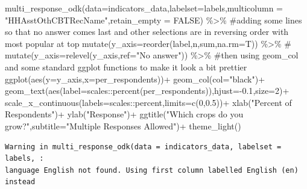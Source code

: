 \documentclass[
  letterpaper,
  DIV=11,
  numbers=noendperiod]{scrreprt}
\newenvironment{Shaded}{\begin{snugshade}}{\end{snugshade}}
\newcommand{\AttributeTok}[1]{\textcolor[rgb]{0.40,0.45,0.13}{#1}}
\newcommand{\CommentTok}[1]{\textcolor[rgb]{0.37,0.37,0.37}{#1}}
\newcommand{\ConstantTok}[1]{\textcolor[rgb]{0.56,0.35,0.01}{#1}}
\newcommand{\DecValTok}[1]{\textcolor[rgb]{0.68,0.00,0.00}{#1}}
\newcommand{\FloatTok}[1]{\textcolor[rgb]{0.68,0.00,0.00}{#1}}
\newcommand{\FunctionTok}[1]{\textcolor[rgb]{0.28,0.35,0.67}{#1}}
\newcommand{\NormalTok}[1]{\textcolor[rgb]{0.00,0.23,0.31}{#1}}
\newcommand{\SpecialCharTok}[1]{\textcolor[rgb]{0.37,0.37,0.37}{#1}}
\newcommand{\StringTok}[1]{\textcolor[rgb]{0.13,0.47,0.30}{#1}}
\begin{document}
\begin{Shaded}
\begin{Highlighting}[]
\FunctionTok{multi\_response\_odk}\NormalTok{(}\AttributeTok{data=}\NormalTok{indicators\_data,}\AttributeTok{labelset=}\NormalTok{labels,}\AttributeTok{multicolumn =} \StringTok{"HHAsstOthCBTRecName"}\NormalTok{,}\AttributeTok{retain\_empty =} \ConstantTok{FALSE}\NormalTok{) }\SpecialCharTok{\%\textgreater{}\%}
  \CommentTok{\#adding some lines so that no answer comes last and other selections are in reversing order with most popular at top}
  \FunctionTok{mutate}\NormalTok{(}\AttributeTok{y\_axis=}\FunctionTok{reorder}\NormalTok{(label,n,sum,}\AttributeTok{na.rm=}\NormalTok{T)) }\SpecialCharTok{\%\textgreater{}\%}
    \CommentTok{\# mutate(y\_axis=relevel(y\_axis,ref="No answer")) \%\textgreater{}\%}
\CommentTok{\#then using geom\_col and some standard ggplot functions to make it look a bit prettier}
  \FunctionTok{ggplot}\NormalTok{(}\FunctionTok{aes}\NormalTok{(}\AttributeTok{y=}\NormalTok{y\_axis,}\AttributeTok{x=}\NormalTok{per\_respondents))}\SpecialCharTok{+}
    \FunctionTok{geom\_col}\NormalTok{(}\AttributeTok{col=}\StringTok{"black"}\NormalTok{)}\SpecialCharTok{+}
      \FunctionTok{geom\_text}\NormalTok{(}\FunctionTok{aes}\NormalTok{(}\AttributeTok{label=}\NormalTok{scales}\SpecialCharTok{::}\FunctionTok{percent}\NormalTok{(per\_respondents)),}\AttributeTok{hjust=}\SpecialCharTok{{-}}\FloatTok{0.1}\NormalTok{,}\AttributeTok{size=}\DecValTok{2}\NormalTok{)}\SpecialCharTok{+}
        \FunctionTok{scale\_x\_continuous}\NormalTok{(}\AttributeTok{labels=}\NormalTok{scales}\SpecialCharTok{::}\NormalTok{percent,}\AttributeTok{limits=}\FunctionTok{c}\NormalTok{(}\DecValTok{0}\NormalTok{,}\FloatTok{0.5}\NormalTok{))}\SpecialCharTok{+}
          \FunctionTok{xlab}\NormalTok{(}\StringTok{"Percent of Respondents"}\NormalTok{)}\SpecialCharTok{+}
            \FunctionTok{ylab}\NormalTok{(}\StringTok{"Response"}\NormalTok{)}\SpecialCharTok{+}
              \FunctionTok{ggtitle}\NormalTok{(}\StringTok{"Which crops do you grow?"}\NormalTok{,}\AttributeTok{subtitle=}\StringTok{"Multiple Responses Allowed"}\NormalTok{)}\SpecialCharTok{+}
                \FunctionTok{theme\_light}\NormalTok{()}
\end{Highlighting}
\end{Shaded}

\begin{verbatim}
Warning in multi_response_odk(data = indicators_data, labelset = labels, :
language English not found. Using first column labelled English (en) instead
\end{verbatim}
\end{document}

